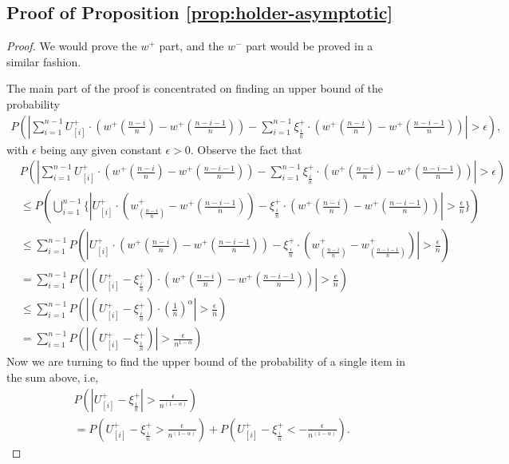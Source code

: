 \subsection*{Proof of Proposition \ref{prop:holder-asymptotic}}
\begin{proof}
We would prove the $w^+$ part, and the $w^-$ part would be proved in a similar fashion.

The main part of the proof is concentrated on finding an upper bound of the probability
\begin{align}
P ( \left| \sum_{i=1}^{n-1} U^+_{[i]} \cdot (w^+(\frac{n-i}{n} )  - w^+(\frac{n-i-1}{n} ) ) -
\sum_{i=1}^{n-1} \xi^+_{\frac{i}{n}} \cdot (w^+(\frac{n-i}{n} )  - w^+(\frac{n-i-1}{n} ) ) \right| >
\epsilon),
\end{align}
with $\epsilon$
being any given constant $\epsilon>0$.
Observe the fact that
\begin{align*}
& P ( \left| \sum_{i=1}^{n-1} U^+_{[i]} \cdot (w^+(\frac{n-i}{n} )  - w^+(\frac{n-i-1}{n} ) ) -
\sum_{i=1}^{n-1} \xi^+_{\frac{i}{n}} \cdot (w^+(\frac{n-i}{n} )  - w^+(\frac{n-i-1}{n} ) ) \right| >
\epsilon) \\ & \leq P ( \bigcup _{i=1}^{n-1} \{ \left| U^+_{[i]} \cdot (w^+_{(\frac{n-i}{n})} -
w^+{(\frac{n-i-1}{n})}) - \xi^+_{\frac{i}{n}} \cdot (w^+(\frac{n-i}{n} )  - w^+(\frac{n-i-1}{n} ) )
\right| > \frac{\epsilon}{n} \}) \\ & \leq \sum _{i=1}^{n-1} P ( \left| U^+_{[i]} \cdot
(w^+(\frac{n-i}{n} )  - w^+(\frac{n-i-1}{n} ) ) - \xi^+_{\frac{i}{n}} \cdot (w^+_{(\frac{n-i}{n})} -
w^+_{(\frac{n-i-1}{n})}) \right| > \frac{\epsilon}{n}) \\ & = \sum _{i=1}^{n-1} P ( \left| ( U^+_{[i]} -
\xi^+_{\frac{i}{n}}) \cdot (w^+(\frac{n-i}{n} )  - w^+(\frac{n-i-1}{n} ) ) \right| > \frac{\epsilon}{n})
\\ & \leq \sum _{i=1}^{n-1} P ( \left| ( U^+_{[i]} - \xi^+_{\frac{i}{n}}) \cdot (\frac{1}{n})^{\alpha}
\right| > \frac{\epsilon}{n}) \\ & = \sum _{i=1}^{n-1} P ( \left| ( U^+_{[i]} - \xi^+_{\frac{i}{n}})
\right| > \frac{\epsilon}{n^{1-\alpha}})
\end{align*}
Now we are turning to find the upper bound of the probability of a single item in the sum above, i.e,
\begin{align*}
& P( \left | U^+_{[i]} - \xi^+_{\frac{i}{n}} \right | > \frac {\epsilon} {n^{(1-\alpha)}}) \\ & = P (
    U^+_{[i]} - \xi^+_{\frac{i}{n}} > \frac {\epsilon} {n^{(1-\alpha)}}) + P ( U^+_{[i]} -
    \xi^+_{\frac{i}{n}} < - \frac {\epsilon} {n^{(1-\alpha)}}).
\end{align*} 


\end{proof}
